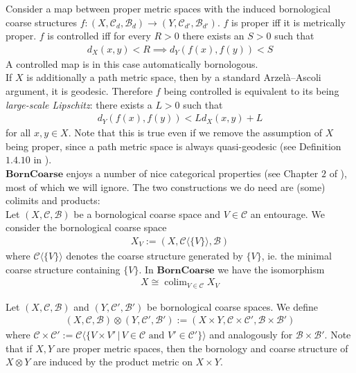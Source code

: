 \documentclass[a4paper,11pt]{article}
\theoremstyle{definition}
\theoremstyle{plain}
\theoremstyle{remark}
\DeclareMathOperator{\colim}{colim}
\begin{document}
Consider a map between proper metric spaces with the induced bornological coarse structures $f: (X,\mathcal{C}_{d},\mathcal{B}_{d})\rightarrow (Y,\mathcal{C}_{d'}, \mathcal{B}_{d'})$. $f$ is proper iff it is metrically proper. $f$ is controlled iff for every $R>0$ there exists an $S>0$ such that 
\begin{align*}
d_{X}(x,y)< R \implies d_{Y}(f(x),f(y))<S
\end{align*}
A controlled map is in this case automatically bornologous. \\

If $X$ is additionally a path metric space, then by a standard Arzelà–Ascoli argument, it is geodesic. Therefore $f$ being controlled is equivalent to its being \textit{large-scale Lipschitz}: there exists a $L>0$ such that 
\begin{align*}
d_{Y}(f(x),f(y))< L d_{X}(x,y)+L 
\end{align*}
for all $x,y\in X$. Note that this is true even if we remove the assumption of $X$ being proper, since a path metric space is always quasi-geodesic (see Definition $1.4.10$ in \cite{nowak2023large}).  \\


$\mathbf{BornCoarse}$ enjoys a number of nice categorical properties (see Chapter $2$ of \cite{bunke2020homotopy}), most of which we will ignore. The two constructions we do need are (some) colimits and products:\\

Let $(X,\mathcal{C},\mathcal{B})$ be a bornological coarse space and $V\in \mathcal{C}$ an entourage. We consider the bornological coarse space 
\begin{align*}
X_V:= (X,\mathcal{C}\langle \{V\} \rangle, \mathcal{B})
\end{align*}
where $\mathcal{C}\langle \{V\} \rangle$ denotes the coarse structure generated by $\{V\}$, ie. the minimal coarse structure containing $\{V\}$. In $\mathbf{BornCoarse}$ we have the isomorphism 
\begin{align*}
X\cong \colim_{V\in \mathcal{C}} X_{V}
\end{align*}

Let $(X,\mathcal{C},\mathcal{B})$ and $(Y,\mathcal{C}',\mathcal{B}')$ be bornological coarse spaces. We define 
\begin{align*}
(X,\mathcal{C},\mathcal{B}) \otimes (Y,\mathcal{C}',\mathcal{B}'):= (X\times Y,\mathcal{C}\times \mathcal{C}', \mathcal{B}\times \mathcal{B}')
\end{align*}
where $\mathcal{C}\times \mathcal{C}' := \mathcal{C}\langle \{V\times V' \,|\, V\in \mathcal{C} \text{ and } V'\in \mathcal{C}'\}\rangle $ and analogously for $\mathcal{B}\times \mathcal{B}'$. Note that if $X,Y$ are proper metric spaces, then the bornology and coarse structure of $X\otimes Y$ are induced by the product metric on $X\times Y$. \\
\end{document}
